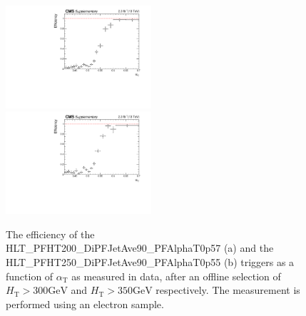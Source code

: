 \clearpage
\begin{figure}[tbhp]
    \caption{ 
    The efficiency of the HLT\_PFHT200\_DiPFJetAve90\_PFAlphaT0p57 (a) and the HLT\_PFHT250\_DiPFJetAve90\_PFAlphaT0p55 (b) triggers as a function of $\alpha_{\mathrm{T}}$ as measured in data, 
    after an offline selection of $H_{\mathrm{T}} > 300 \mathrm{GeV}$ and $H_{\mathrm{T}} > 350 \mathrm{GeV}$ respectively. 
    The measurement is performed using an electron sample. 
    \label{fig:trigger-alphaT-turnons} }
  \begin{center}
  \includegraphics[width=0.48\textwidth]{Trigger_HLT_PFHT200_DiPFJetAve90_PFAlphaT0p57_MoM_HT300_alphaT_aux} ~~
  \includegraphics[width=0.48\textwidth]{Trigger_HLT_PFHT250_DiPFJetAve90_PFAlphaT0p55_MoM_HT350_alphaT_aux}  
  \end{center}
\end{figure}



